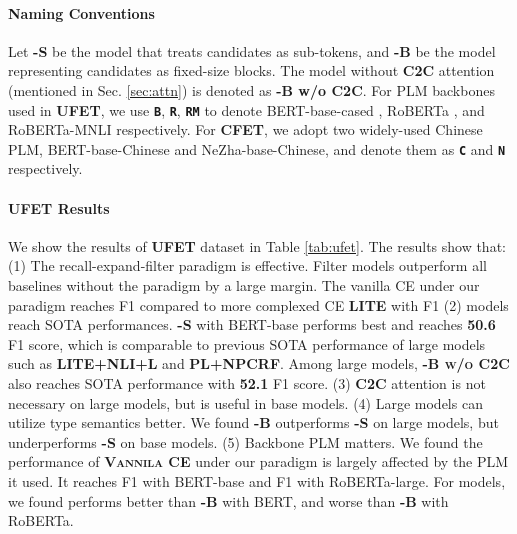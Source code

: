 \documentclass[11pt]{article}
\begin{document}
\paragraph{Naming Conventions}
Let {\bf \textsc{\name-S}} be the {\bf \textsc{\name}} model that treats candidates as sub-tokens, and {\bf \textsc{\name-B}} be the model representing candidates as fixed-size blocks. The {\bf \textsc{\name}} model without {\bf \textsc{C2C}} attention (mentioned in Sec. \ref{sec:attn}) is denoted as {\bf \textsc{\name-B} w/o C2C}. For PLM backbones used in {\bf \textsc{UFET}}, we use {\color{blue} \bf \texttt{B}}, {\color{red} \bf \texttt{R}}, {\color{teal} \bf \texttt{RM}} to denote BERT-base-cased \cite{bert}, RoBERTa \cite{liu2019roberta}, and RoBERTa-MNLI \cite{liu2019roberta} respectively. For {\bf \textsc{CFET}}, we adopt two widely-used Chinese PLM, BERT-base-Chinese and NeZha-base-Chinese, and denote them as {\color{brown} \bf \texttt{C}} and {\color{purple} \bf \texttt{N}} respectively. 

\paragraph{UFET Results} We show the results of {\bf \textsc{UFET}} dataset in Table \ref{tab:ufet}. The results show that: (1) The recall-expand-filter paradigm is effective. Filter models outperform all baselines without the paradigm by a large margin. The vanilla CE under our paradigm reaches  F1 compared to more complexed CE {\bf \textsc{LITE}} with  F1 (2) {\bf \textsc{\name}} models reach SOTA performances. {\bf \textsc{\name-S}} with BERT-base performs best and reaches {\bf 50.6} F1 score, which is comparable to previous SOTA performance of large models such as {\bf \textsc{LITE+NLI+L}} and {\bf \textsc{PL+NPCRF}}. Among large models, {\bf \textsc{\name-B w/o C2C}} also reaches SOTA performance with {\bf 52.1} F1 score. (3) {\bf \textsc{C2C}} attention is not necessary on large models, but is useful in base models. (4) Large models can utilize type semantics better. We found {\bf \textsc{\name-B}} outperforms {\bf \textsc{\name-S}} on large models, but underperforms {\bf \textsc{\name-S}} on base models. (5) Backbone PLM matters. We found the performance of {\bf \textsc{Vannila CE}} under our paradigm is largely affected by the PLM it used. It reaches  F1 with BERT-base and  F1 with RoBERTa-large. For {\bf \textsc{\name}} models, we found {\bf \textsc{\name}} performs better than {\bf \textsc{\name-B}} with BERT, and worse than {\bf \textsc{\name-B}} with RoBERTa. 
\end{document}
